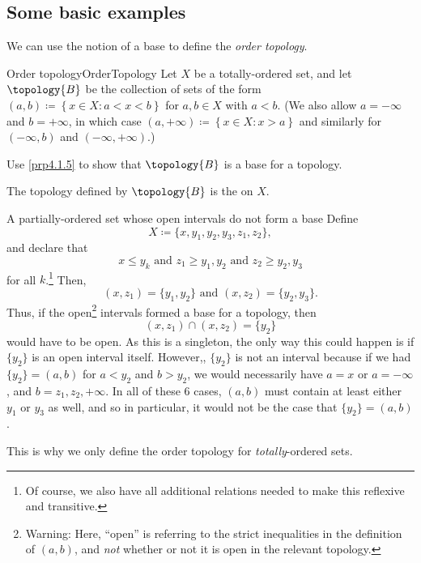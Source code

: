 \subsection{Some basic examples}

We can use the notion of a base to define the \emph{order topology}.
\begin{dfn}{Order topology}{OrderTopology}
Let $X$ be a totally-ordered set, and let $\topology{B}$ be the collection of sets of the form $(a,b)\coloneqq \left\{ x\in X:a<x<b\right\}$ for $a,b\in X$ with $a<b$.  (We also allow $a=-\infty$ and $b=+\infty$, in which case $(a,+\infty )\coloneqq \left\{ x\in X:x>a\right\}$ and similarly for $(-\infty ,b)$ and $(-\infty, +\infty)$.)
\begin{exr}[breakable=false]{}{}
Use \cref{prp4.1.5} to show that $\topology{B}$ is a base for a topology.
\end{exr}
The topology defined by $\topology{B}$ is the  on $X$.
\end{dfn}
\begin{exm}{A partially-ordered set whose open intervals do not form a base}{}
Define
\begin{equation}
X\coloneqq \{ x,y_1,y_2,y_3,z_1,z_2\} ,
\end{equation}
and declare that
\begin{equation}
x\leq y_k\text{ and }z_1\geq y_1,y_2\text{ and }z_2\geq y_2,y_3
\end{equation}
for all $k$.\footnote{Of course, we also have all additional relations needed to make this reflexive and transitive.}  Then,
\begin{equation}
(x,z_1)=\{ y_1,y_2\} \text{ and }(x,z_2)=\{ y_2,y_3\} .
\end{equation}
Thus, if the open\footnote{Warning:  Here, ``open'' is referring to the strict inequalities in the definition of $(a,b)$, and \emph{not} whether or not it is open in the relevant topology.} intervals formed a base for a topology, then
\begin{equation}
(x,z_1)\cap (x,z_2)=\{ y_2\} 
\end{equation}
would have to be open.  As this is a singleton, the only way this could happen is if $\{ y_2\}$ is an open interval itself.  However,, $\{ y_2\}$ is not an interval because if we had $\{ y_2\} =(a,b)$ for $a<y_2$ and $b>y_2$, we would necessarily have $a=x$ or $a=-\infty$, and $b=z_1,z_2,+\infty$.  In all of these $6$ cases, $(a,b)$ must contain at least either $y_1$ or $y_3$ as well, and so in particular, it would not be the case that $\{ y_2\} =(a,b)$.
\begin{rmk}
This is why we only define the order topology for \emph{totally}-ordered sets.
\end{rmk}
\end{exm}
